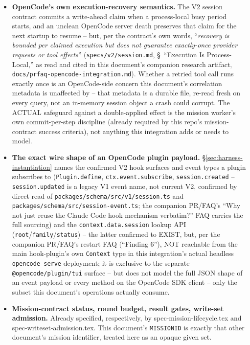\documentclass[a4paper,10pt,fleqn]{article}
\newcommand{\fpath}[1]{\texttt{#1}}
\newcommand{\field}[1]{\texttt{#1}}
\begin{document}
\begin{itemize}
    (\fpath{internal/mission/active.go}:476--550), the per-session
    roster flock (\fpath{internal/session/store.go}'s
    \field{withLock}), the per-mission and per-delegation flocks -- is
    what makes the atomic-step assumption sound in the real system; it
    is not itself re-derived in Z. \S\ref{sec:failure-concurrent}
    states exactly what this document DOES check given that assumption,
    and what it does not.
  \item \textbf{OpenCode's own execution-recovery semantics.} The V2
    session contract commits a write-ahead claim when a process-local
    busy period starts, and an unclean OpenCode server death preserves
    that claim for the next startup to resume -- but, per the
    contract's own words, ``\emph{recovery is bounded per claimed
    execution but does not guarantee exactly-once provider requests or
    tool effects}'' (\fpath{specs/v2/session.md}, \S~``Execution Is
    Process-Local,'' as read and cited in this document's companion
    research artifact, \fpath{docs/prfaq-opencode-integration.md}).
    Whether a retried tool call runs exactly once is an OpenCode-side
    concern this document's correlation metadata is unaffected by --
    that metadata is a durable file, re-read fresh on every query, not
    an in-memory session object a crash could corrupt. The ACTUAL
    safeguard against a double-applied effect is the mission worker's
    own commit-per-step discipline (already required by this repo's
    mission-contract success criteria), not anything this integration
    adds or needs to model.
  \item \textbf{The exact wire shape of an OpenCode plugin payload.}
    \S\ref{sec:harness-instantiation} names the confirmed V2 hook
    surfaces and event types a plugin subscribes to
    (\field{Plugin.define}, \field{ctx.event.subscribe},
    \field{session.created} -- \field{session.updated} is a legacy V1
    event name, not current V2, confirmed by direct read of
    \fpath{packages/schema/src/v1/session.ts} and
    \fpath{packages/schema/src/session-event.ts}; the companion
    PR/FAQ's ``Why not just reuse the Claude Code hook mechanism
    verbatim?'' FAQ carries the full sourcing) and the
    \field{context.data.session} lookup API
    (\field{root}/\field{family}/\field{status}) -- the latter
    confirmed to EXIST, but, per the companion PR/FAQ's restart FAQ
    (``Finding 6''), NOT reachable from the main hook-plugin's own
    \field{Context} type in this integration's actual headless
    \field{opencode serve} deployment; it is exclusive to the separate
    \field{@opencode/plugin/tui} surface -- but does not model
    the full JSON shape of an event payload or every method on the
    OpenCode SDK client -- only the subset this document's operations
    actually consume.
  \item \textbf{Mission-contract status, round budget, result gates,
    write-set admission.} Already specified, respectively, by
    spec-mission-lifecycle.tex and spec-writeset-admission.tex. This
    document's \field{MISSIONID} is exactly that other document's
    mission identifier, treated here as an opaque given set.
\end{itemize}
\end{document}
